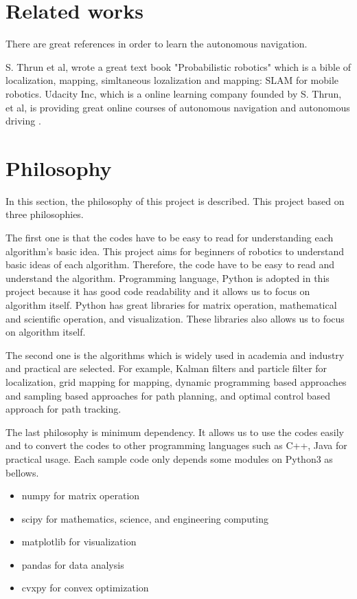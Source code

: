 \documentclass{bmvc2k}
\begin{document}
\section{Related works}

There are great references in order to learn the autonomous navigation.

S. Thrun et al, wrote a great text book "Probabilistic robotics" which is a bible of localization, mapping, simltaneous lozalization and mapping: SLAM for mobile robotics\cite{PR}.
Udacity Inc, which is a online learning company founded by S. Thrun, et al, is providing great online courses of autonomous navigation and autonomous driving \cite{udacity}.

\section{Philosophy}
In this section, the philosophy of this project is described.
This project based on three philosophies.

The first one is that the codes have to be easy to read for understanding each algorithm's basic idea.
This project aims for beginners of robotics to understand basic ideas of each algorithm. 
Therefore, the code have to be easy to read and understand the algorithm.
Programming language, Python\cite{python} is adopted in this project because it has good code readability and it allows us to focus on algorithm itself.
Python has great libraries for matrix operation, mathematical and scientific operation, and visualization.
These libraries also allows us to focus on algorithm itself.

The second one is the algorithms which is widely used in academia and industry and practical are selected.
For example, Kalman filters and particle filter for localization, grid mapping for mapping, dynamic programming based approaches and sampling based approaches for path planning, and optimal control based approach for path tracking.

The last philosophy is minimum dependency.
It allows us to use the codes easily and to convert the codes to other programming languages such as C++, Java for practical usage.
Each sample code only depends some modules on Python3 as bellows.

\begin{itemize}
 \item numpy\cite{numpy} for matrix operation
 \item scipy\cite{scipy} for mathematics, science, and engineering computing
 \item matplotlib\cite{matplotlib} for visualization
 \item pandas\cite{pandas} for data analysis
 \item cvxpy\cite{cvxpy} for convex optimization
\end{itemize}
\end{document}
